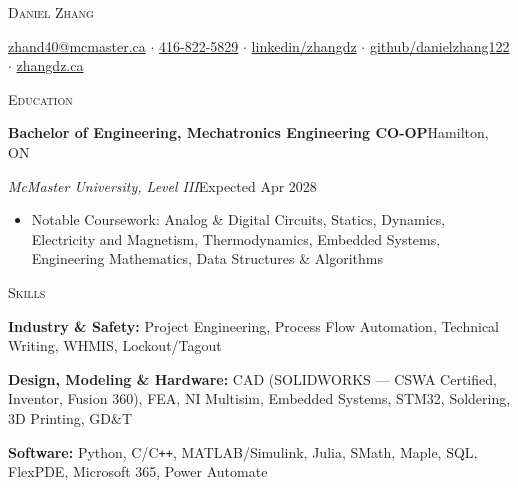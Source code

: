 \documentclass[a4paper]{article}
\newcommand{\lineunder} {
    \par\vspace*{-2pt}
    \noindent\hrulefill
    \par\vspace*{2pt}
}
\newcommand{\header}[1]{
    \vspace*{3pt}
    {\hspace*{-4pt}\large\textsc{#1}}
    \lineunder
}
\begin{document}
\vspace*{-20pt}


\vspace*{-12pt}
\begin{center}
    {\Huge \scshape {Daniel Zhang}}\\
    \vspace{2pt}

\href{mailto:zhand40@mcmaster.ca}{zhand40@mcmaster.ca} $\cdot$
\href{tel:4168225829}{416-822-5829} $\cdot$
\href{https://www.linkedin.com/in/zhangdz}{linkedin/zhangdz} $\cdot$
\href{https://github.com/danielzhang122}{github/danielzhang122} $\cdot$
\href{https://zhangdz.ca}{zhangdz.ca} \\

\end{center}
\vspace*{-10pt}


\header{Education}
\textbf{Bachelor of Engineering, Mechatronics Engineering CO-OP}\hfill Hamilton, ON \par
\textit{McMaster University, Level III}\hfill Expected Apr 2028
\vspace{2mm}
\begin{itemize}
    \item Notable Coursework: Analog \& Digital Circuits, Statics, Dynamics, Electricity and Magnetism, Thermodynamics, Embedded Systems, Engineering Mathematics, Data Structures \& Algorithms
\end{itemize}

\vspace{1.5mm}

\header{Skills}
\vspace{1.5mm}
\textbf{Industry \& Safety:} Project Engineering, Process Flow Automation, Technical Writing, WHMIS, Lockout/Tagout
\par\vspace{3pt}

\textbf{Design, Modeling \& Hardware:} CAD (SOLIDWORKS --- CSWA Certified, Inventor, Fusion 360), FEA, NI Multisim, Embedded Systems, STM32, Soldering, 3D Printing, GD\&T
\par\vspace{3pt}

\textbf{Software:} Python, C/C\texttt{++}, MATLAB/Simulink, Julia, SMath, Maple, SQL, FlexPDE, Microsoft 365, Power Automate
\end{document}
